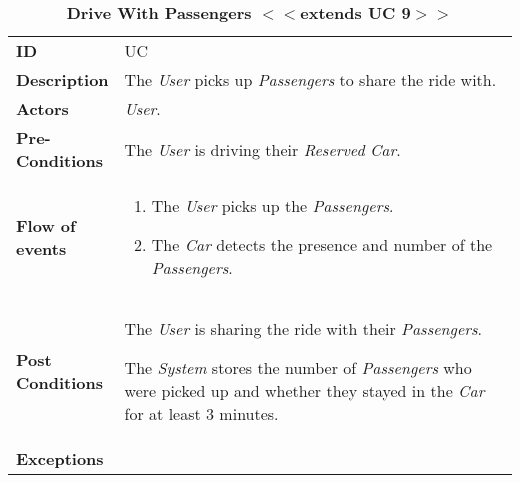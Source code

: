 \begin{longtable}{|p{0.2\linewidth} p{0.8\linewidth}|}
	\captionsetup{labelformat=empty} %
	\caption{\textbf{Drive With Passengers $<<$extends UC 9$>>$}} %
	\label{UC_DriveWithPassengers}%
	\\ \hline %
	
	\textbf{ID} & UC\theUseCaseIdCounter \\ \hline
	\textbf{Description} & The \emph{User} picks up \emph{Passengers} to share the ride with. \\ \hline
	\textbf{Actors} & \emph{User}.\\ \hline
	\textbf{Pre-Conditions} & The \emph{User} is driving their \emph{Reserved} \emph{Car}. \\ \hline
	\textbf{Flow of events} & 
	\begin{enumerate}
		\item The \emph{User} picks up the \emph{Passengers}.
		\item The \emph{Car} detects the presence and number of the \emph{Passengers}.
	\end{enumerate}	 \\ \hline
	\textbf{Post Conditions} & The \emph{User} is sharing the ride with their \emph{Passengers}.
	
	The \emph{System} stores the number of \emph{Passengers} who were picked up and whether they stayed in the \emph{Car} for at least 3 minutes.\\ \hline
	\textbf{Exceptions} & \\ \hline
\end{longtable}

